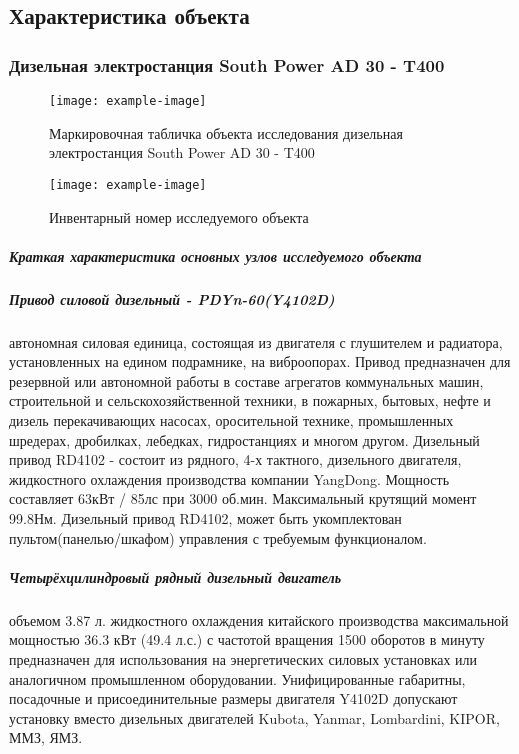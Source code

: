 \subsection{ Характеристика объекта }
\subsubsection{Дизельная электростанция South Power AD 30 - T400}



\begin{figure}[H]
	\centering
	\texttt{[image: example-image]}
	\caption[]{Маркировочная табличка объекта исследования дизельная электростанция South Power AD 30 - T400}
\end{figure}

\begin{figure}[H]
	\centering
	\texttt{[image: example-image]}
	\caption{Инвентарный номер исследуемого объекта}
	\label{fig:инв}
\end{figure}



\subparagraph{Краткая характеристика основных узлов исследуемого объекта}

\subparagraph{Привод силовой дизельный - PDYn-60(Y4102D)} автономная силовая единица, состоящая из двигателя с глушителем и радиатора, установленных на едином подрамнике, на виброопорах. Привод предназначен для резервной или автономной работы в составе агрегатов коммунальных машин, строительной и сельскохозяйственной техники, в пожарных, бытовых, нефте и дизель перекачивающих насосах, оросительной технике, промышленных шредерах, дробилках, лебедках, гидростанциях и многом другом. Дизельный привод RD4102 - состоит из рядного, 4-х тактного, дизельного двигателя, жидкостного охлаждения производства компании YangDong. Мощность составляет 63кВт / 85лс при 3000 об.мин. Максимальный крутящий момент 99.8Нм. Дизельный привод RD4102, может быть укомплектован пультом(панелью/шкафом) управления с требуемым функционалом.

%
%
\subparagraph{Четырёхцилиндровый рядный дизельный двигатель} объемом 3.87 л. жидкостного охлаждения китайского производства максимальной мощностью 36.3 кВт (49.4 л.с.) с частотой вращения 1500 оборотов в минуту предназначен для использования на энергетических силовых установках или аналогичном промышленном оборудовании.  Унифицированные габаритны, посадочные и присоединительные размеры двигателя Y4102D допускают установку вместо дизельных двигателей Kubota, Yanmar, Lombardini, KIPOR, ММЗ, ЯМЗ.

